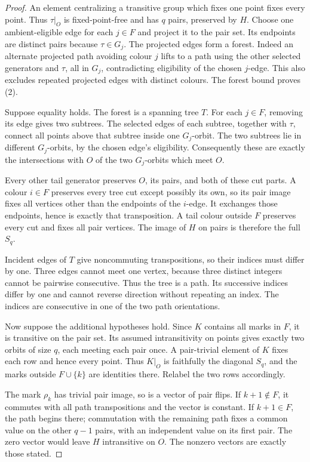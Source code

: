 \documentclass[11pt,a4paper]{article}
\begin{document}
\begin{proof}
An element centralizing a transitive group which fixes one point
fixes every point. Thus $\tau|_O$ is fixed-point-free and has
$q$ pairs, preserved by $H$. Choose one ambient-eligible edge for
each $j\in F$ and project it to the pair set. Its endpoints are
distinct pairs because $\tau\in G_j$. The projected edges form a
forest. Indeed an alternate projected path avoiding colour $j$
lifts to a path using the other selected generators and $\tau$,
all in $G_j$, contradicting eligibility of the chosen $j$-edge.
This also excludes repeated projected edges with distinct colours.
The forest bound proves (2).

Suppose equality holds. The forest is a spanning tree $T$.
For each $j\in F$, removing its edge gives two subtrees.
The selected edges of each subtree, together with $\tau$, connect
all points above that subtree inside one $G_j$-orbit. The two
subtrees lie in different $G_j$-orbits, by the chosen edge's
eligibility. Consequently these are exactly the intersections
with $O$ of the two $G_j$-orbits which meet $O$.

Every other tail generator preserves $O$, its pairs, and both
of these cut parts. A colour $i\in F$ preserves every tree cut
except possibly its own, so its pair image fixes all vertices
other than the endpoints of the $i$-edge. It exchanges those
endpoints, hence is exactly that transposition. A tail colour
outside $F$ preserves every cut and fixes all pair vertices.
The image of $H$ on pairs is therefore the full $S_q$.

Incident edges of $T$ give noncommuting transpositions, so their
indices must differ by one. Three edges cannot meet one vertex,
because three distinct integers cannot be pairwise consecutive.
Thus the tree is a path. Its successive indices differ by one
and cannot reverse direction without repeating an index.
The indices are consecutive in one of the two path orientations.

Now suppose the additional hypotheses hold. Since $K$ contains
all marks in $F$, it is transitive on the pair set. Its assumed
intransitivity on points gives exactly two orbits of size $q$,
each meeting each pair once. A pair-trivial element of $K$ fixes
each row and hence every point. Thus $K|_O$ is faithfully the
diagonal $S_q$, and the marks outside $F\cup\{k\}$ are identities
there. Relabel the two rows accordingly.

The mark $\rho_k$ has trivial pair image, so is a vector of pair
flips. If $k+1\notin F$, it commutes with all path transpositions
and the vector is constant. If $k+1\in F$, the path begins there;
commutation with the remaining path fixes a common value on the
other $q-1$ pairs, with an independent value on its first pair.
The zero vector would leave $H$ intransitive on $O$. The nonzero
vectors are exactly those stated.
\end{proof}
\end{document}
